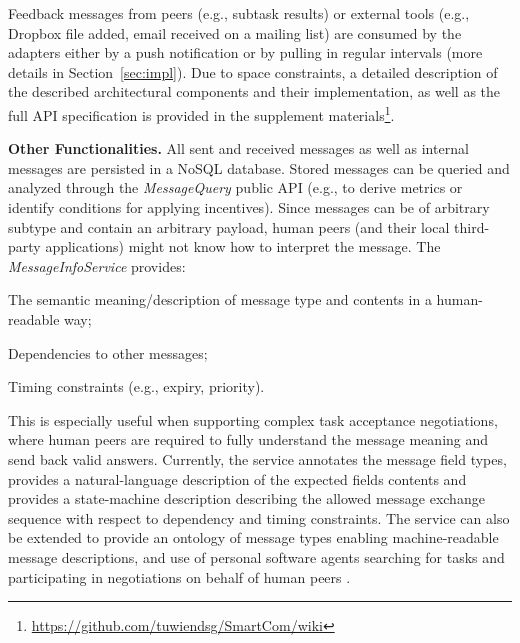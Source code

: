 \documentclass{llncs}
\newcommand{\mdl}{\textsc{SmartCom}}
\begin{document}
    Feedback messages from peers (e.g., subtask results) or external tools (e.g., Dropbox file added, email received on a mailing list) are consumed by the adapters either by a push notification or by pulling in regular intervals (more details in Section~\ref{sec:impl}). 
    Due to space constraints, a detailed description of the described architectural components and their implementation, as well as the full API specification is provided in the supplement materials\footnote{\url{https://github.com/tuwiendsg/SmartCom/wiki}}.\addtocounter{footnote}{-1}

  \textbf{Other Functionalities.}
    All sent and received messages as well as internal messages are persisted in a NoSQL database. Stored messages can be queried and analyzed through the \emph{MessageQuery} public API (e.g., to derive metrics or identify conditions for applying incentives).
    Since messages can be of arbitrary subtype and contain an arbitrary payload, human peers (and their local third-party applications) might not know how to interpret the message. The \emph{MessageInfoService} provides:
    \begin{inparaenum}[\itshape a)]
        \item The semantic meaning/description of message type and contents in a human-readable way; 
        \item Dependencies to other messages;
        \item Timing constraints (e.g., expiry, priority).
    \end{inparaenum}
    This is especially useful when supporting complex task acceptance negotiations, where human peers are required to fully understand the message meaning and send back valid answers. 
    Currently, the service annotates the message field types, provides a natural-language description of the expected fields contents and provides a state-machine description describing the allowed message exchange sequence with respect to dependency and timing constraints. The service can also be extended to provide an ontology of message types enabling machine-readable message descriptions, and use of personal software agents searching for tasks and participating in negotiations on behalf of human peers \cite{KobiGal}. 
\end{document}
